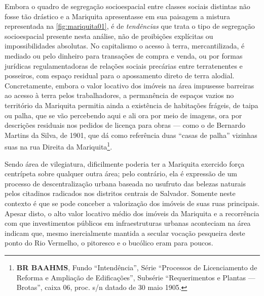
Embora o quadro de segregação socioespacial entre classes sociais distintas não fosse tão drástico e a Mariquita apresentasse em sua paisagem a mistura representada na \autoref{fig:mariquita01}, é de \textit{tendências} que trata o tipo de segregação socioespacial presente nesta análise, não de proibições explícitas ou impossibilidades absolutas. No capitalismo o acesso à terra, mercantilizada, é mediado ou pelo dinheiro para transações de compra e venda, ou por formas jurídicas regulamentadoras de relações sociais precárias entre terratenentes e posseiros, com espaço residual para o apossamento direto de terra alodial. Concretamente, embora o valor locativo dos imóveis na área impusesse barreiras ao acesso à terra pelos trabalhadores, a permanência de espaços vazios no território da Mariquita permitia ainda a existência de habitações frágeis, de taipa ou palha, que se vão percebendo aqui e ali ora por meio de imagens, ora por descrições residuais nos pedidos de licença para obras --- como o de Bernardo Martins da Silva, de 1901, que dá como referência duas ``casas de palha'' vizinhas suas na rua Direita da Mariquita\footnote{\textbf{BR BAAHMS}, Fundo ``Intendência'', Série ``Processos de Licenciamento de Reforma e Ampliação de Edificações'', Subsérie ``Requerimentos e Plantas --- Brotas'', caixa 06, proc. s/n datado de 30 maio 1905.}.

Sendo área de vilegiatura, dificilmente poderia ter a Mariquita exercido força centrípeta sobre qualquer outra área; pelo contrário, ela é expressão de um processo de descentralização urbana baseada no usufruto das belezas naturais pelos citadinos radicados nos distritos centrais de Salvador. Somente neste contexto é que se pode conceber a valorização dos imóveis de suas ruas principais. Apesar disto, o alto valor locativo médio dos imóveis da Mariquita e a recorrência com que investimentos públicos em infraestruturas urbanas aconteciam na área indicam que, mesmo inercialmente mantida a secular vocação pesqueira deste ponto do Rio Vermelho, o pitoresco e o bucólico eram para poucos. 

